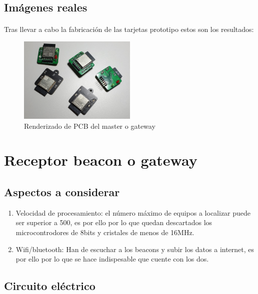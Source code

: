 \documentclass[a4paper ,12pt, onecolumn]{article}
\begin{document}
    \subsection{Imágenes reales}
        \paragraph{}
        Tras llevar a cabo la fabricación de las tarjetas prototipo estos son los resultados:
        \begin{center}
            \begin{figure}[ht]
                \centering
                \includegraphics[width=0.5\textwidth]{../real_beacon_pcb.jpeg}
                \caption{Renderizado de PCB del master o gateway}
                \label{fig:mesh3}
            \end{figure}    
        \end{center}       
\section{Receptor beacon o gateway}
    \subsection{Aspectos a considerar}
        \begin{enumerate}
            \item Velocidad de procesamiento: el número máximo de equipos a localizar puede ser superior a 500, es por ello 
            por lo que quedan descartados los microcontrodores de 8bits y cristales de menos de 16MHz.
            \item Wifi/bluetooth: Han de escuchar a los beacons y subir los datos a internet, es por ello por lo que se hace 
            indispesable que cuente con los dos.
        \end{enumerate}

    \subsection{Circuito eléctrico}
\end{document}
